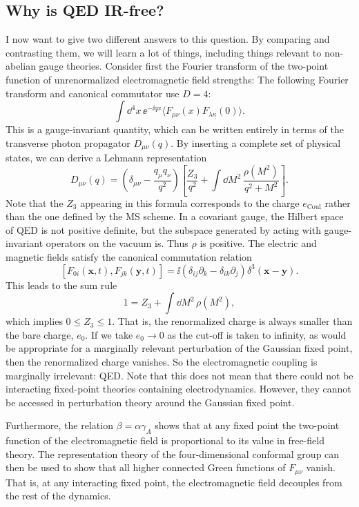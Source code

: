 \subsection{Why is QED IR-free?}

I now want to give two different answers to this question. By comparing and
contrasting them, we will learn a lot of things, including things relevant to
non-abelian gauge theories. Consider first the Fourier transform of the
two-point function of unrenormalized electromagnetic field strengths:
The following Fourier transform and canonical commutator use $D=4$:
\[
  \int\dd^4x\,\ee^{-\ii qx}
  \langle F_{\mu\nu}(x)F_{\lambda\kappa}(0)\rangle.
\]
This is a gauge-invariant quantity, which can be written entirely in terms of
the transverse photon propagator $D_{\mu\nu}(q)$. By inserting a complete set
of physical states, we can derive a Lehmann representation
\[
  D_{\mu\nu}(q)=\left(\delta_{\mu\nu}-\frac{q_\mu q_\nu}{q^2}\right)
  \left[\frac{Z_3}{q^2}+\int\dd M^2\,
  \frac{\rho(M^2)}{q^2+M^2}\right].
\]
Note that the $Z_3$ appearing in this formula corresponds to the charge
$e_{\mathrm{Coul}}$ rather than the one defined by the MS scheme. In a
covariant gauge, the Hilbert space of QED is not positive definite, but the
subspace generated by acting with gauge-invariant operators on the vacuum is.
Thus $\rho$ is positive. The electric and magnetic fields satisfy the
canonical commutation relation
\[
  [F_{0i}(\mathbf x,t),F_{jk}(\mathbf y,t)]
  =\ii(\delta_{ij}\partial_k-\delta_{ik}\partial_j)
  \delta^3(\mathbf x-\mathbf y).
\]
This leads to the sum rule
\[
  1=Z_3+\int\dd M^2\,\rho(M^2),
\]
which implies $0\leq Z_3\leq1$. That is, the renormalized charge is always
smaller than the bare charge, $e_0$. If we take $e_0\to0$ as the cut-off is
taken to infinity, as would be appropriate for a marginally relevant
perturbation of the Gaussian fixed point, then the renormalized charge
vanishes. So the electromagnetic coupling is marginally irrelevant: QED. Note
that this does not mean that there could not be interacting fixed-point
theories containing electrodynamics. However, they cannot be accessed in
perturbation theory around the Gaussian fixed point.

Furthermore, the relation $\beta=\alpha\gamma_A$ shows that at any fixed point
the two-point function of the electromagnetic field is proportional to its
value in free-field theory. The representation theory of the four-dimensional
conformal group can then be used to show that all higher connected Green
functions of $F_{\mu\nu}$ vanish. That is, at any interacting fixed point, the
electromagnetic field decouples from the rest of the dynamics.

